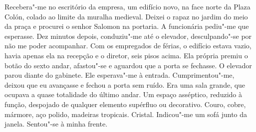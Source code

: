 Recebera"-me no escritório da empresa, um edifício novo, na face norte
da Plaza Colón, colado ao limite da muralha medieval. Deixei o rapaz no
jardim do meio da praça e procurei o senhor Salomon na portaria. A
funcionária pediu"-me que esperasse. Dez minutos depois, conduziu"-me
até o elevador, desculpando"-se por não me poder acompanhar. Com os
empregados de férias, o edifício estava vazio, havia apenas ela na
recepção e o diretor, seis pisos acima. Ela própria premiu o botão do
sexto andar, afastou"-se e aguardou que a porta se fechasse. O elevador
parou diante do gabinete. Ele esperava"-me à entrada. Cumprimentou"-me,
deixou que eu avançasse e fechou a porta sem ruído. Era uma sala grande,
que ocupava a quase totalidade do último andar. Um espaço asséptico,
reduzido à função, despojado de qualquer elemento supérfluo ou
decorativo. Couro, cobre, mármore, aço polido, madeiras tropicais.
Cristal. Indicou"-me um sofá junto da janela. Sentou"-se à minha frente.

